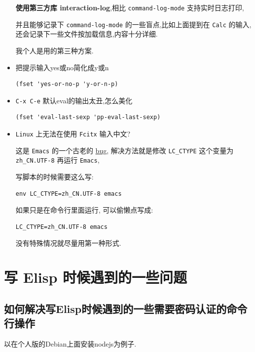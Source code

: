 \documentclass[11pt]{article}
\begin{document}
\begin{itemize}
\textbf{使用第三方库 interaction-log},相比 \texttt{command-log-mode} 支持实时日志打印,

并且能够记录下 \texttt{command-log-mode} 的一些盲点,比如上面提到在 \texttt{Calc} 的输入,还会记录下一些文件按加载信息,内容十分详细.

我个人是用的第三种方案.

\item 把提示输入yes或no简化成y或n

\begin{verbatim}
(fset 'yes-or-no-p 'y-or-n-p)
\end{verbatim}

\item \texttt{C-x C-e} 默认eval的输出太丑,怎么美化

\begin{verbatim}
(fset 'eval-last-sexp 'pp-eval-last-sexp)
\end{verbatim}

\item \texttt{Linux} 上无法在使用 \texttt{Fcitx} 输入中文?

这是 \texttt{Emacs} 的一个古老的 \href{https://wiki.archlinux.org/title/fcitx\#Emacs}{bug}, 解决方法就是修改 \texttt{LC\_CTYPE} 这个变量为 \texttt{zh\_CN.UTF-8} 再运行 \texttt{Emacs},

写脚本的时候需要这么写:

\begin{verbatim}
env LC_CTYPE=zh_CN.UTF-8 emacs
\end{verbatim}

如果只是在命令行里面运行, 可以偷懒点写成:

\begin{verbatim}
LC_CTYPE=zh_CN.UTF-8 emacs
\end{verbatim}

没有特殊情况就尽量用第一种形式.
\end{itemize}

\section{写 Elisp 时候遇到的一些问题}
\label{sec:orgf04bd4a}

\subsection{如何解决写Elisp时候遇到的一些需要密码认证的命令行操作}
\label{sec:orgdc565b6}

以在个人版的Debian上面安装nodejs为例子.
\end{document}

